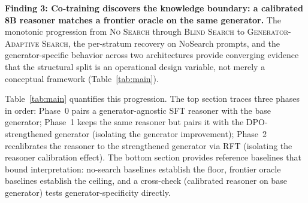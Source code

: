 \documentclass{article}
\newcommand{\CondNS}{\textsc{No Search}}
\newcommand{\CondGS}{\textsc{Blind Search}}
\newcommand{\CondGAS}{\textsc{Generator-Adaptive Search}}
\begin{document}
\begin{finding} %
\textbf{Finding 3: Co-training discovers the knowledge boundary: a calibrated 8B reasoner matches a frontier oracle on the same generator.}
The monotonic progression from \CondNS{} through \CondGS{} to \CondGAS{}, the per-stratum recovery on NoSearch prompts, and the generator-specific behavior across two architectures provide converging evidence that the structural split is an operational design variable, not merely a conceptual framework (Table~\ref{tab:main}).
\end{finding}

Table~\ref{tab:main} quantifies this progression.
The top section traces three phases in order: Phase~0 pairs a generator-agnostic SFT reasoner with the base generator; Phase~1 keeps the same reasoner but pairs it with the DPO-strengthened generator (isolating the generator improvement); Phase~2 recalibrates the reasoner to the strengthened generator via RFT (isolating the reasoner calibration effect).
The bottom section provides reference baselines that bound interpretation: no-search baselines establish the floor, frontier oracle baselines establish the ceiling, and a cross-check (calibrated reasoner on base generator) tests generator-specificity directly.
\end{document}
